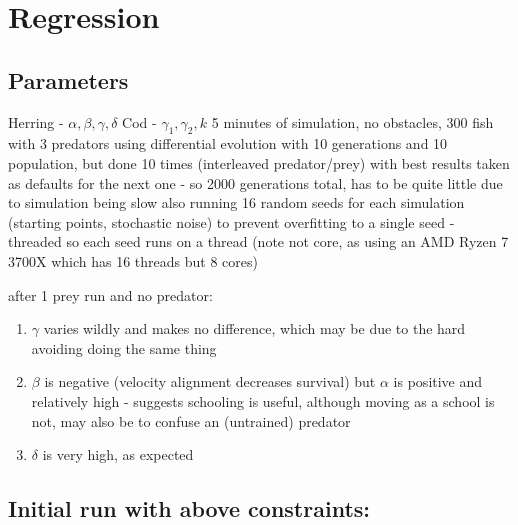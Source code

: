 \section{Regression}
\subsection{Parameters}
Herring - $\alpha,\beta,\gamma,\delta$
Cod - $\gamma_1,\gamma_2,k$
5 minutes of simulation, no obstacles, 300 fish with 3 predators
using differential evolution with 10 generations and 10 population, but done 10 times (interleaved predator/prey) with best results taken as defaults for the next one - so 2000 generations total, has to be quite little due to simulation being slow
also running 16 random seeds for each simulation (starting points, stochastic noise) to prevent overfitting to a single seed - threaded so each seed runs on a thread (note not core, as using an AMD Ryzen 7 3700X which has 16 threads but 8 cores)

after 1 prey run and no predator:
\begin{enumerate}
    \item $\gamma$ varies wildly and makes no difference, which may be due to the hard avoiding doing the same thing
    \item $\beta$ is negative (velocity alignment decreases survival) but $\alpha$ is positive and relatively high - suggests schooling is useful, although moving as a school is not, may also be to confuse an (untrained) predator 
    \item $\delta$ is very high, as expected
\end{enumerate}

\subsection{Initial run with above constraints:}

